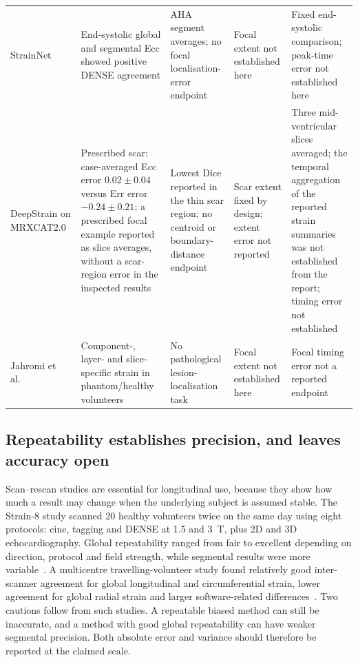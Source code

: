 {\begin{longtable}{L{0.143\textwidth}L{0.209\textwidth}L{0.198\textwidth}L{0.187\textwidth}L{0.187\textwidth}}
\addlinespace
StrainNet~\cite{wang2023strainnet} & End-systolic global and segmental Ecc showed positive DENSE agreement & AHA segment averages; no focal localisation-error endpoint & Focal extent not established here & Fixed end-systolic comparison; peak-time error not established here \\
\addlinespace
DeepStrain on MRXCAT2.0~\cite{mrxcat2023} & Prescribed scar: case-averaged Ecc error \(0.02\pm0.04\) versus Err error \(-0.24\pm0.21\); a prescribed focal example reported as slice averages, without a scar-region error in the inspected results & Lowest Dice reported in the thin scar region; no centroid or boundary-distance endpoint & Scar extent fixed by design; extent error not reported & Three mid-ventricular slices averaged; the temporal aggregation of the reported strain summaries was not established from the report; timing error not established \\
\addlinespace
Jahromi et al.~\cite{jahromi2026densecine} & Component-, layer- and slice-specific strain in phantom/healthy volunteers & No pathological lesion-localisation task & Focal extent not established here & Focal timing error not a reported endpoint \\
\bottomrule
\end{longtable}
}

\subsection{Repeatability establishes precision, and leaves accuracy open}

Scan--rescan studies are essential for longitudinal use, because they show how much a result may change when the underlying subject is assumed stable. The Strain-8 study scanned 20 healthy volunteers twice on the same day using eight protocols: cine, tagging and DENSE at 1.5 and 3~T, plus 2D and 3D echocardiography. Global repeatability ranged from fair to excellent depending on direction, protocol and field strength, while segmental results were more variable~\cite{bell2025strain8}. A multicentre travelling-volunteer study found relatively good inter-scanner agreement for global longitudinal and circumferential strain, lower agreement for global radial strain and larger software-related differences~\cite{goetze2026}. Two cautions follow from such studies. A repeatable biased method can still be inaccurate, and a method with good global repeatability can have weaker segmental precision. Both absolute error and variance should therefore be reported at the claimed scale.

